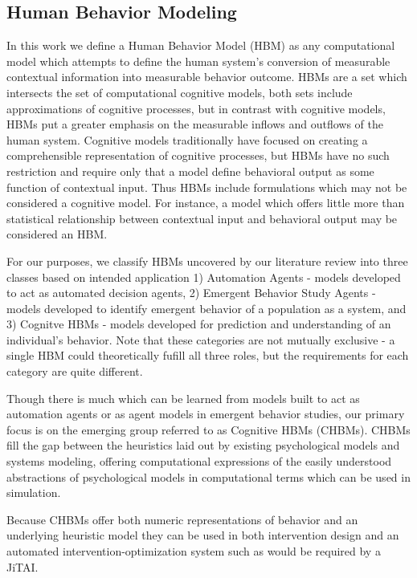 \documentclass[conference]{IEEEtran}
\begin{document}
\subsection{Human Behavior Modeling}
In this work we define a Human Behavior Model (HBM) as any computational model which attempts to define the human system’s conversion of measurable contextual information into measurable behavior outcome. 
HBMs are a set which intersects the set of computational cognitive models, both sets include approximations of cognitive processes, but in contrast with cognitive models, HBMs put a greater emphasis on the measurable inflows and outflows of the human system.
Cognitive models traditionally have focused on creating a comprehensible representation of cognitive processes, but HBMs have no such restriction and require only that a model define behavioral output as some function of contextual input.
Thus HBMs include formulations which may not be considered a cognitive model.
For instance, a model which offers little more than statistical relationship between contextual input and behavioral output may be considered an HBM.

For our purposes, we classify HBMs uncovered by our literature review into three classes based on intended application 1) Automation Agents\cite{wooldridge1995agent} - models developed to act as automated decision agents, 2) Emergent Behavior Study Agents\cite{li2006survey} - models developed to identify emergent behavior of a population as a system, and 3) Cognitve HBMs - models developed for prediction and understanding of an individual's behavior.
Note that these categories are not mutually exclusive - a single HBM could theoretically fufill all three roles, but the requirements for each category are quite different.

Though there is much which can be learned from models built to act as automation agents or as agent models in emergent behavior studies, our primary focus is on the emerging group referred to as Cognitive HBMs (CHBMs).
CHBMs fill the gap between the heuristics laid out by existing psychological models and systems modeling, offering computational expressions of the easily understood abstractions of psychological models in computational terms which can be used in simulation.

Because CHBMs offer both numeric representations of behavior and an underlying heuristic model they can be used in both intervention design and an automated intervention-optimization system such as would be required by a JiTAI.
\end{document}
